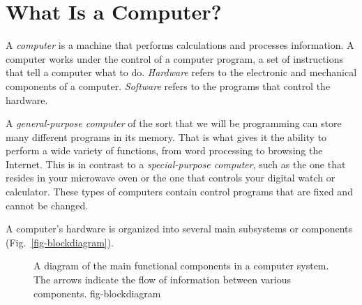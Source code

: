 \vspace{-12pt}\section{What Is a Computer?}
\noindent A {\it computer} is a machine that performs calculations and
processes information.  A computer works under the control of a
computer program, a set of instructions that tell a computer what to
do.  {\it Hardware} refers to the electronic and mechanical components
of a computer.  {\it Software} refers to the programs that control the
hardware.

A {\it general-purpose computer} of the sort that we will be
programming can store many different programs in its memory. That is
what gives it the ability to perform a wide variety of functions, from
word processing to browsing the Internet. This is in contrast to a
{\it special-purpose computer}, such as the one that resides in your
microwave oven or the one that controls your digital watch or
calculator.  These types of computers contain control programs that
are fixed and cannot be changed.

A computer's hardware is organized into several main subsystems or
components (Fig.~\ref{fig-blockdiagram}).

\begin{figure}[h]
{A diagram of the main functional
components in a computer system. The arrows indicate the flow of information
between various components.
} {fig-blockdiagram}
\end{figure}

